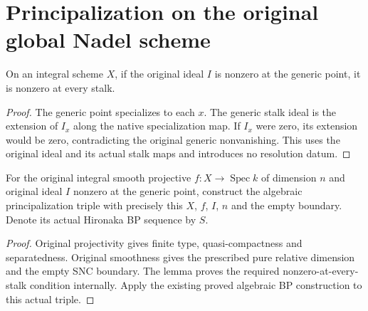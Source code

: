 \section{Principalization on the original global Nadel scheme}

\begin{lemma}\label{lem:kn-nadel-generic-nonzero-everywhere}
\leanok
On an integral scheme $X$, if the original ideal $I$ is nonzero at
the generic point, it is nonzero at every stalk.
\end{lemma}
\begin{proof}
The generic point specializes to each $x$.  The generic stalk ideal is
the extension of $I_x$ along the native specialization map.  If $I_x$
were zero, its extension would be zero, contradicting the original
generic nonvanishing.  This uses the original ideal and its actual stalk
maps and introduces no resolution datum.
\end{proof}

\begin{definition}\label{def:kn-nadel-original-global-bp}
\leanok
{}
For the original integral smooth projective $f:X\to\operatorname{Spec}k$
of dimension $n$ and original ideal $I$ nonzero at the generic point,
construct the algebraic principalization triple with precisely this $X$,
$f$, $I$, $n$ and the empty boundary.  Denote its actual Hironaka BP
sequence by $S$.
\end{definition}
\begin{proof}
Original projectivity gives finite type, quasi-compactness and
separatedness.  Original smoothness gives the prescribed pure relative
dimension and the empty SNC boundary.  The lemma proves the required
nonzero-at-every-stalk condition internally.  Apply the existing proved
algebraic BP construction to this actual triple.
\end{proof}

